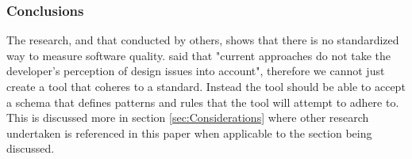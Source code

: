 \subsubsection{Conclusions}
The research, and that conducted by others, shows that there is no standardized way to measure software quality. \cite{10.1145/3428029.3428047, 10.1145/2674683.2674702} said that "current approaches do not take the developer's perception of design issues into account", therefore we cannot just create a tool that coheres to a standard. Instead the tool should be able to accept a schema that defines patterns and rules that the tool will attempt to adhere to.
This is discussed more in section \ref{sec:Considerations} where other research undertaken is referenced in this paper when applicable to the section being discussed.
